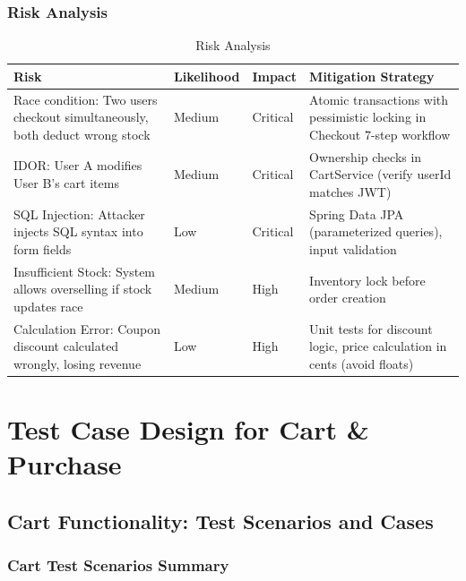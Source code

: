 \documentclass[11pt,a4paper]{article}
\begin{document}
\subsubsection{Risk Analysis}

\begin{table}[H]
\centering
\small
\begin{tabularx}{\textwidth}{|X|l|l|X|}
\hline
\textbf{Risk} & \textbf{Likelihood} & \textbf{Impact} & \textbf{Mitigation Strategy} \\
\hline
Race condition: Two users checkout simultaneously, both deduct wrong stock & Medium & Critical & Atomic transactions with pessimistic locking in Checkout 7-step workflow \\
\hline
IDOR: User A modifies User B's cart items & Medium & Critical & Ownership checks in CartService (verify userId matches JWT) \\
\hline
SQL Injection: Attacker injects SQL syntax into form fields & Low & Critical & Spring Data JPA (parameterized queries), input validation \\
\hline
Insufficient Stock: System allows overselling if stock updates race & Medium & High & Inventory lock before order creation \\
\hline
Calculation Error: Coupon discount calculated wrongly, losing revenue & Low & High & Unit tests for discount logic, price calculation in cents (avoid floats) \\
\hline
\end{tabularx}
\caption{Risk Analysis}
\end{table}

\section{Test Case Design for Cart \& Purchase}

\subsection{Cart Functionality: Test Scenarios and Cases}

\subsubsection{Cart Test Scenarios Summary}
\end{document}
